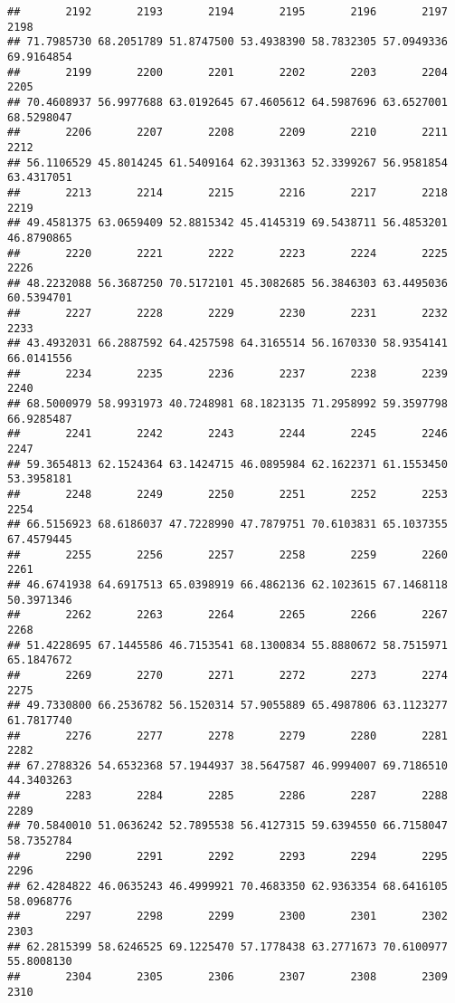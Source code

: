 \documentclass[
]{article}
\begin{document}
\begin{verbatim}
##       2192       2193       2194       2195       2196       2197       2198 
## 71.7985730 68.2051789 51.8747500 53.4938390 58.7832305 57.0949336 69.9164854 
##       2199       2200       2201       2202       2203       2204       2205 
## 70.4608937 56.9977688 63.0192645 67.4605612 64.5987696 63.6527001 68.5298047 
##       2206       2207       2208       2209       2210       2211       2212 
## 56.1106529 45.8014245 61.5409164 62.3931363 52.3399267 56.9581854 63.4317051 
##       2213       2214       2215       2216       2217       2218       2219 
## 49.4581375 63.0659409 52.8815342 45.4145319 69.5438711 56.4853201 46.8790865 
##       2220       2221       2222       2223       2224       2225       2226 
## 48.2232088 56.3687250 70.5172101 45.3082685 56.3846303 63.4495036 60.5394701 
##       2227       2228       2229       2230       2231       2232       2233 
## 43.4932031 66.2887592 64.4257598 64.3165514 56.1670330 58.9354141 66.0141556 
##       2234       2235       2236       2237       2238       2239       2240 
## 68.5000979 58.9931973 40.7248981 68.1823135 71.2958992 59.3597798 66.9285487 
##       2241       2242       2243       2244       2245       2246       2247 
## 59.3654813 62.1524364 63.1424715 46.0895984 62.1622371 61.1553450 53.3958181 
##       2248       2249       2250       2251       2252       2253       2254 
## 66.5156923 68.6186037 47.7228990 47.7879751 70.6103831 65.1037355 67.4579445 
##       2255       2256       2257       2258       2259       2260       2261 
## 46.6741938 64.6917513 65.0398919 66.4862136 62.1023615 67.1468118 50.3971346 
##       2262       2263       2264       2265       2266       2267       2268 
## 51.4228695 67.1445586 46.7153541 68.1300834 55.8880672 58.7515971 65.1847672 
##       2269       2270       2271       2272       2273       2274       2275 
## 49.7330800 66.2536782 56.1520314 57.9055889 65.4987806 63.1123277 61.7817740 
##       2276       2277       2278       2279       2280       2281       2282 
## 67.2788326 54.6532368 57.1944937 38.5647587 46.9994007 69.7186510 44.3403263 
##       2283       2284       2285       2286       2287       2288       2289 
## 70.5840010 51.0636242 52.7895538 56.4127315 59.6394550 66.7158047 58.7352784 
##       2290       2291       2292       2293       2294       2295       2296 
## 62.4284822 46.0635243 46.4999921 70.4683350 62.9363354 68.6416105 58.0968776 
##       2297       2298       2299       2300       2301       2302       2303 
## 62.2815399 58.6246525 69.1225470 57.1778438 63.2771673 70.6100977 55.8008130 
##       2304       2305       2306       2307       2308       2309       2310 

\end{verbatim}
\end{document}
